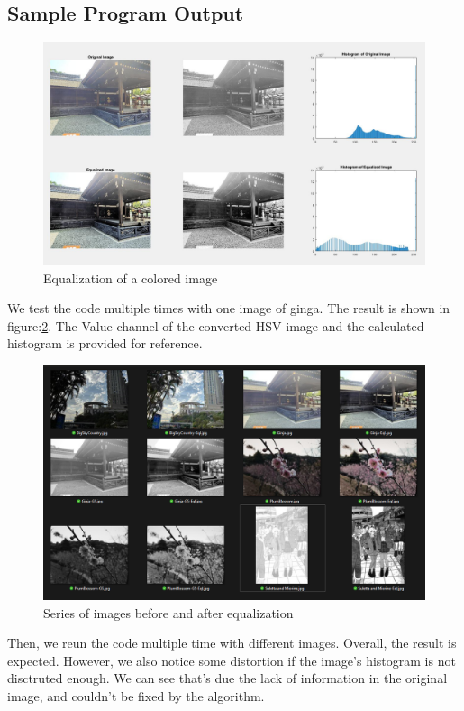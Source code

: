 \documentclass[a4paper,11pt]{article}
\begin{document}
\subsection{Sample Program Output}
\begin{figure}[H]
    \centering
    \includegraphics[width=0.8\linewidth]{Demo2-Colored.jpg}
    \caption{Equalization of a colored image}
    \label{pic:Demo_2}
\end{figure}
We test the code multiple times with one image of ginga. The result is shown in figure:\ref{pic:Demo_2}. The Value channel of the converted HSV image and the calculated histogram is provided for reference.\\
\begin{figure}[H]
    \centering
    \includegraphics[width=0.9\linewidth]{Demo_1.png}
    \caption{Series of images before and after equalization}
    \label{pic:Demo_2}
\end{figure}
Then, we reun the code multiple time with different images. Overall, the result is expected. However, we also notice some distortion if the image's histogram is not disctruted enough. We can see that's due the lack of information in the original image, and couldn't be fixed by the algorithm.\\
\end{document}
